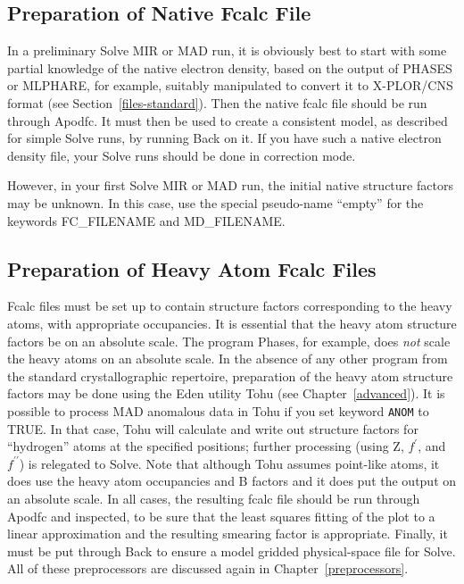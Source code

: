 \documentclass{report}
\begin{document}
\subsection {Preparation of Native Fcalc File}
\label{mir-preparation-native}

In a preliminary Solve MIR or MAD run, it is obviously best to start with 
some partial 
knowledge of the native electron density, based on the output of PHASES
or MLPHARE, for example, suitably manipulated to convert it to
X-PLOR/CNS format (see Section~\ref{files-standard}).
Then the native fcalc file should be run through  Apodfc.
It must then be
used to create a consistent model, as described for simple Solve runs,
by running Back on it.
If you have such a native electron density file, your Solve runs should be 
done in correction mode.

\vspace {0.1in}

However, in your first Solve MIR or MAD run, the initial native structure
factors may be unknown.  In this case, use the special pseudo-name ``empty'' 
for the keywords FC\_FILENAME 
and MD\_FILENAME.


\subsection {Preparation of Heavy Atom Fcalc Files}
\label{mir-preparation-heavy}

Fcalc files must be set up to contain structure factors 
corresponding to the heavy atoms, with appropriate occupancies.  
It is essential that the heavy atom structure factors be on an absolute
scale.  The program Phases, for example, does {\em not} scale 
the heavy atoms on an absolute scale.
In the absence of any other program from the
standard crystallographic repertoire, preparation of the heavy atom 
structure factors may be done using the Eden utility 
Tohu (see Chapter~\ref{advanced}).  
It is possible to process MAD anomalous data in 
Tohu if you set keyword {\tt ANOM}  
to TRUE.  
In that case, Tohu will calculate and write out structure
factors for ``hydrogen'' 
atoms at the specified positions; further
processing (using Z, $f^\prime$, and $f^{\prime\prime}$) 
is relegated to Solve.
Note that although Tohu 
assumes point-like atoms, it does use the heavy atom occupancies
and B factors and it does put the output on an absolute scale.
In all cases, the resulting fcalc file should be run
through Apodfc and inspected, to be sure that 
the least squares fitting of the
plot to a linear approximation and the resulting smearing factor
is appropriate. Finally, it must be put through Back 
to ensure a model gridded physical-space file for Solve.
All of these preprocessors are discussed again in Chapter~\ref{preprocessors}.
\end{document}
